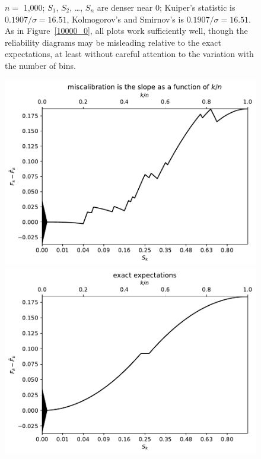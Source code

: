 \documentclass{article}
\begin{document}
\begin{figure}
\begin{centering}
\end{centering}
\caption{$n =$ 1,000; $S_1$, $S_2$, \dots, $S_n$ are denser near 0;
         Kuiper's statistic is $0.1907 / \sigma = 16.51$,
         Kolmogorov's and Smirnov's is $0.1907 / \sigma = 16.51$.
As in Figure~\ref{10000_0}, all plots work sufficiently well,
though the reliability diagrams may be misleading
relative to the exact expectations,
at least without careful attention to the variation with the number of bins.
}
\label{1000_0}
\end{figure}


\begin{figure}
\begin{centering}

\parbox{\imsize}{\includegraphics[width=\imsize]
                {./codes/unweighted/100_4_1_2/cumulative.pdf}}
\quad\quad
\parbox{\imsize}{\includegraphics[width=\imsize]
                {./codes/unweighted/100_4_1_2/cumulative_exact.pdf}}


\end{centering}
\end{figure}
\end{document}
